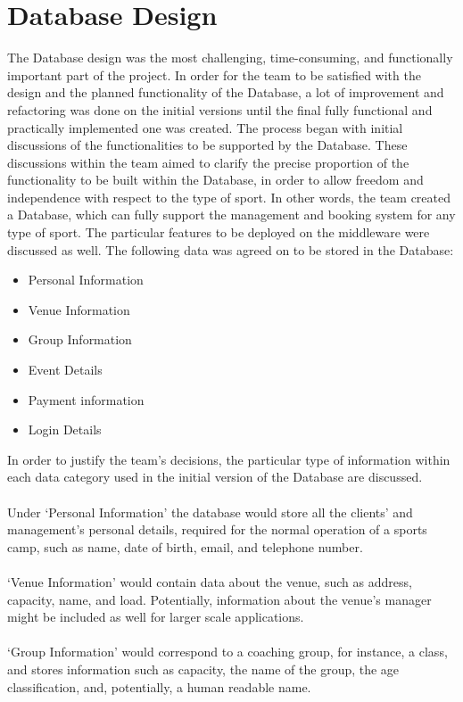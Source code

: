 \documentclass{l3proj}
\begin{document}
\section{Database Design}
\par
The Database design was the most challenging, time-consuming, and functionally important part of the project. In order for the team to be satisfied with the design and the planned functionality of the Database, a lot of improvement and refactoring was done on the initial versions until the final fully functional and practically implemented one was created. The process began with initial discussions of the functionalities to be supported by the Database. These discussions within the team aimed to clarify the precise proportion of the functionality to be built within the Database, in order to allow freedom and independence with respect to the type of sport. In other words, the team created a Database, which can fully support the management and booking system for any type of sport. The particular features to be deployed on the middleware were discussed as well. The following data was agreed on to be stored in the Database:
\begin{itemize}
	\item Personal Information
	\item Venue Information
	\item Group Information
	\item Event Details
	\item Payment information
	\item Login Details
\end{itemize}
\par In order to justify the team's decisions, the particular type of information within each data category used in the initial version of the Database are discussed.\\
\\Under `Personal Information' the database would store all the clients' and management's personal details, required for the normal operation of a sports camp, such as name, date of birth, email, and telephone number.\\
\\`Venue Information' would contain data about the venue, such as address, capacity, name, and load. Potentially, information about the venue's manager might be included as well for larger scale applications.\\
\\`Group Information' would correspond to a coaching group, for instance, a class, and stores information such as capacity, the name of the group, the age classification, and, potentially, a human readable name.\\
\end{document}
